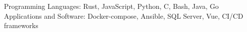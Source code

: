 
\begin{cvskills}
  \cvskill
    {Programming Languages:} %
    {Rust, JavaScript, Python, C, Bash, Java, Go} %
  \cvskill
    {Applications and Software:} %
    {Docker-compose, Ansible, SQL Server, Vue, CI/CD frameworks} %
\end{cvskills}
